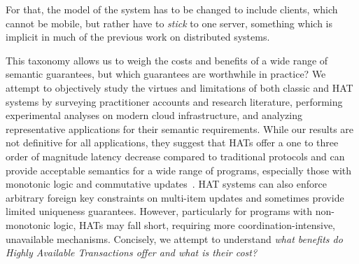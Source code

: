 

For that, the model of the system has to be changed to include
clients, which cannot be mobile, but rather have to {\em stick} to one
server, something which is implicit in much of the previous work on
distributed systems.


This taxonomy allows us to weigh the costs and benefits of a wide
range of semantic guarantees, but which guarantees are worthwhile in
practice? We attempt to objectively study the virtues and limitations
of both classic and HAT systems by surveying practitioner accounts and
research literature, performing experimental analyses on modern cloud
infrastructure, and analyzing representative applications for their
semantic requirements. While our results are not definitive for all
applications, they suggest that HATs offer a one to three order of
magnitude latency decrease compared to traditional protocols and can
provide acceptable semantics for a wide range of programs, especially
those with monotonic logic and commutative updates~\cite{calm, blooml,
  crdt}. HAT systems can also enforce arbitrary foreign key
constraints on multi-item updates and sometimes provide limited
uniqueness guarantees. However, particularly for programs with
non-monotonic logic, HATs may fall short, requiring more
coordination-intensive, unavailable mechanisms. Concisely, we attempt
to understand \textit{what benefits do Highly Available Transactions
  offer and what is their cost?}
